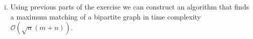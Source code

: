 \begin{exercise}{2}
\begin{enumerate}[i)]
{            %





            }
        \item{Using previous parts of the exercise we can construct an
            algorithm that finds a maximum matching of a bipartite graph in time
            complexity $\mathcal{O}(\sqrt{n}(m + n))$.

}
\end{enumerate}
\end{exercise}
